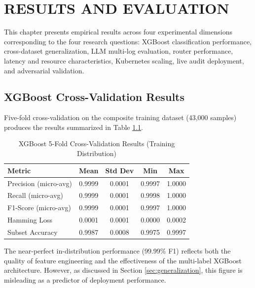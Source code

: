 \documentclass[12pt,oneside]{report}
\begin{document}
\chapter{RESULTS AND EVALUATION}

This chapter presents empirical results across four experimental dimensions corresponding to the four research questions: XGBoost classification performance, cross-dataset generalization, LLM multi-log evaluation, router performance, latency and resource characteristics, Kubernetes scaling, live audit deployment, and adversarial validation.

\section{XGBoost Cross-Validation Results}

Five-fold cross-validation on the composite training dataset (43,000 samples) produces the results summarized in Table \ref{tab:xgboost_cv}.

\begin{table}[H]
\centering
\caption{XGBoost 5-Fold Cross-Validation Results (Training Distribution)}
\label{tab:xgboost_cv}
\renewcommand{\arraystretch}{1.3}
\begin{tabular}{|l|c|c|c|c|}
\hline
\textbf{Metric} & \textbf{Mean} & \textbf{Std Dev} & \textbf{Min} & \textbf{Max} \\
\hline
Precision (micro-avg) & 0.9999 & 0.0001 & 0.9997 & 1.0000 \\
Recall (micro-avg) & 0.9999 & 0.0001 & 0.9998 & 1.0000 \\
F1-Score (micro-avg) & 0.9999 & 0.0001 & 0.9997 & 1.0000 \\
Hamming Loss & 0.0001 & 0.0001 & 0.0000 & 0.0002 \\
Subset Accuracy & 0.9987 & 0.0008 & 0.9975 & 0.9997 \\
\hline
\end{tabular}
\end{table}

The near-perfect in-distribution performance (99.99\% F1) reflects both the quality of feature engineering and the effectiveness of the multi-label XGBoost architecture. However, as discussed in Section \ref{sec:generalization}, this figure is misleading as a predictor of deployment performance.
\end{document}
